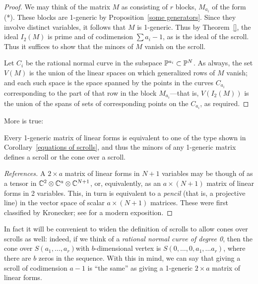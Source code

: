 \begin{proof} We may think of the matrix $M$ as consisting of $r$ blocks, $M_{a_{i}}$ of the form (*). These blocks are 1-generic by Proposition~\ref{some generators}. Since they involve distinct variables, it follows that $M$ is 1-generic. Thus by
Theorem~\ref{}, the ideal $I_{2}(M)$ is prime and of codimension $\sum a_{i}-1$, as is the ideal of the scroll. Thus it suffices to show that the minors of $M$ vanish on the scroll.

Let $C_{i}$ be the rational normal curve in the subspace $\PP^{a_{i}}\subset\PP^{N}$.
As always, the set $V(M)$ is the union of the linear spaces on which generalized rows of $M$ vanish; and each such space is the space spanned by the points in the curves $C_{a_{i}}$ corresponding to the part of that row in the block $M_{a_{i}}$---that is, $V(I_{2}(M))$ is the union of the spans of sets of corresponding points on the $C_{a_{i}}$, as required.
\end{proof}

More is true: 
\begin{fact}
 Every
 1-generic matrix of linear forms is equivalent to one of the type shown in
Corollary~\ref{equations of scrolls}, and thus the minors of any 1-generic matrix defines a scroll or the cone over a scroll. 

\end{fact}

\begin{proof}[References]
A $2\times a$ matrix of linear forms in $N+1$ variables may be though of as a tensor
in $\CC^{2}\otimes \CC^{a}\otimes \CC^{N+1}$, or, equivalently, as an $a\times (N+1)$ matrix of linear forms in 2 variables. This, in turn is equivalent to a \emph{pencil} (that is, a projective line) in the vector space of scalar $a\times (N+1)$ matrices. These were first classified by Kronecker; see 
\cite[Theorems *** and ***]{Gantmacher} for a modern exposition. 
\end{proof}

In fact it will be convenient to widen the definition of scrolls to allow cones over scrolls as well: indeed, if we think of a \emph{rational normal curve of degree 0}, then the cone over $S(a_{1}, \dots, a_{r})$with $b$-dimensional  vertex is $S(0,\dots,0, a_{1}, \dots a_{r})$, where there are 
$b$ zeros in the sequence. With this in mind, we can say that giving a scroll of codimension $a-1$ is ``the same'' as giving a 1-generic $2\times a$ matrix of linear forms.

